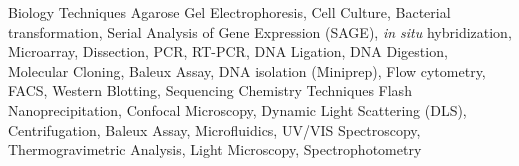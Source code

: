 \begin{cvskills}
  \cvskill
    {Biology Techniques}
    {Agarose Gel Electrophoresis, Cell Culture, Bacterial transformation, Serial Analysis of Gene Expression (SAGE), \emph{in situ} hybridization, Microarray, Dissection, PCR, RT-PCR, DNA Ligation, DNA Digestion, Molecular Cloning, Baleux Assay, DNA isolation (Miniprep), Flow cytometry, FACS, Western Blotting, Sequencing}
  \cvskill
    {Chemistry Techniques}
    {Flash Nanoprecipitation, Confocal Microscopy, Dynamic Light Scattering (DLS), Centrifugation, Baleux Assay, Microfluidics, UV/VIS Spectroscopy, Thermogravimetric Analysis, Light Microscopy, Spectrophotometry}
\end{cvskills}
